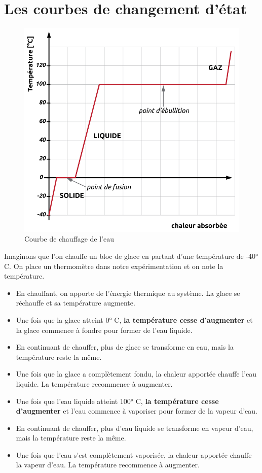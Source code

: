 \documentclass[
  11pt,
  a4paper,
  openany]{book}
\providecommand{\tightlist}{%
  \setlength{\itemsep}{0pt}\setlength{\parskip}{0pt}}
\begin{document}
\hypertarget{les-courbes-de-changement-duxe9tat}{%
\section{Les courbes de changement d'état}\label{les-courbes-de-changement-duxe9tat}}

\begin{figure}

{\centering \includegraphics[width=0.4\linewidth]{images/courbe-chgt-etat} 

}

\caption{Courbe de chauffage de l'eau}\label{fig:courbe-chgt-etat}
\end{figure}

Imaginons que l'on chauffe un bloc de glace en partant d'une température de -40° C. On place un thermomètre dans notre expérimentation et on note la température.

\begin{itemize}
\tightlist
\item
  En chauffant, on apporte de l'énergie thermique au système. La glace se réchauffe et sa température augmente.
\item
  Une fois que la glace atteint 0° C, \textbf{la température cesse d'augmenter} et la glace commence à fondre pour former de l'eau liquide.
\item
  En continuant de chauffer, plus de glace se transforme en eau, mais la température reste la même.
\item
  Une fois que la glace a complètement fondu, la chaleur apportée chauffe l'eau liquide.
  La température recommence à augmenter.
\item
  Une fois que l'eau liquide atteint 100° C, \textbf{la température cesse d'augmenter} et l'eau commence à vaporiser pour former de la vapeur d'eau.
\item
  En continuant de chauffer, plus d'eau liquide se transforme en vapeur d'eau, mais la température reste la même.
\item
  Une fois que l'eau s'est complètement vaporisée, la chaleur apportée chauffe la vapeur d'eau.
  La température recommence à augmenter.
\end{itemize}
\end{document}

